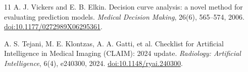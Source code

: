 \documentclass[11pt]{article}
\begin{document}
\begin{thebibliography}{11}
A. J. Vickers and E. B. Elkin.
Decision curve analysis: a novel method for evaluating prediction models.
\emph{Medical Decision Making}, 26(6), 565--574, 2006.
\href{https://doi.org/10.1177/0272989X06295361}{doi:10.1177/0272989X06295361}.

A. S. Tejani, M. E. Klontzas, A. A. Gatti, et al.
Checklist for Artificial Intelligence in Medical Imaging (CLAIM): 2024 update.
\emph{Radiology: Artificial Intelligence}, 6(4), e240300, 2024.
\href{https://doi.org/10.1148/ryai.240300}{doi:10.1148/ryai.240300}.
\end{thebibliography}
\end{document}
